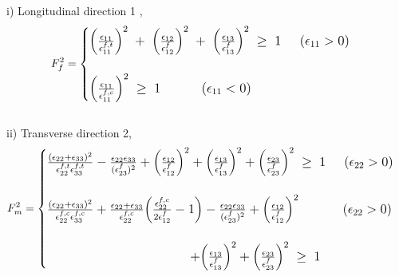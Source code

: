 \documentclass[12pt,openright,twoside]{report}
\begin{document}
i) Longitudinal direction 1 ,
\begin{equation}
\large{F_{f}^{2} =  
	\begin{cases}
	
		\Big(\frac{\epsilon_{11}}{\epsilon_{11}^{f,t}}\Big)^{2} \; + \; \Big(\frac{\epsilon_{12}}{\epsilon_{12}^{f}}\Big)^{2} \; + \; \Big(\frac{\epsilon_{13}}{\epsilon_{13}^{f}}\Big)^{2} \; \geq  \; 1  \; \; \; \; \;  (\epsilon_{11}  >  0)  \\
	\\
	\Big(\frac{\epsilon_{11}}{\epsilon_{11}^{f,c}}\Big)^{2}  \; \geq  \; 1 \; \; \; \; \; \; \;  \; \; \; \;  (\epsilon_{11}  <  0) 

	
	\end{cases}}
\end{equation}
\\
ii) Transverse direction 2,
\\
\begin{equation}
\large{F_{m}^{2} =  
	\begin{cases}
	
	\frac{(\epsilon_{22} + \epsilon_{33} )^{2}}{\epsilon_{22}^{f,t} \epsilon_{33}^{f,t}}   -  \frac{\epsilon_{22}\epsilon_{33}}{(\epsilon_{23}^{f})^{2}}  +  \Big(\frac{\epsilon_{12}}{\epsilon_{12}^{f}}\Big)^{2}  + \Big(\frac{\epsilon_{13}}{\epsilon_{13}^{f}}\Big)^{2}  +  \Big(\frac{\epsilon_{23}}{\epsilon_{23}^{f}}\Big)^{2} \;\geq  \; 1 \; \; \; \; \;  (\epsilon_{22}  >  0) \\
	\\
	
	\frac{(\epsilon_{22} + \epsilon_{33} )^{2}}{\epsilon_{22}^{f,c} \epsilon_{33}^{f,c}}  +  \frac{\epsilon_{22} + \epsilon_{33}}{\epsilon_{22}^{f,c}}\Big(\frac{\epsilon_{22}^{f,c}}{2\epsilon_{12}^{f}}  -  1\Big)   -  \frac{\epsilon_{22}\epsilon_{33}}{(\epsilon_{23}^{f})^{2}}  +  \Big(\frac{\epsilon_{12}}{\epsilon_{12}^{f}}\Big)^{2}\; \; \; \; \; \; \; \; \; \; \; \;  (\epsilon_{22}  >  0) \\ 
\\	
	\; \; \; \; \; \; \; \;\; \; \; \; \; \; \; \;\; \; \; \; \; \; \; \;  \; \;\; \; \; \; \; \; \; \;\; \; \; \; \;  + \Big(\frac{\epsilon_{13}}{\epsilon_{13}^{f}}\Big)^{2}   +  \Big(\frac{\epsilon_{23}}{\epsilon_{23}^{f}}\Big)^{2} \;\geq \; 1 
	
	
	\end{cases}}
\end{equation}
\\
\end{document}
